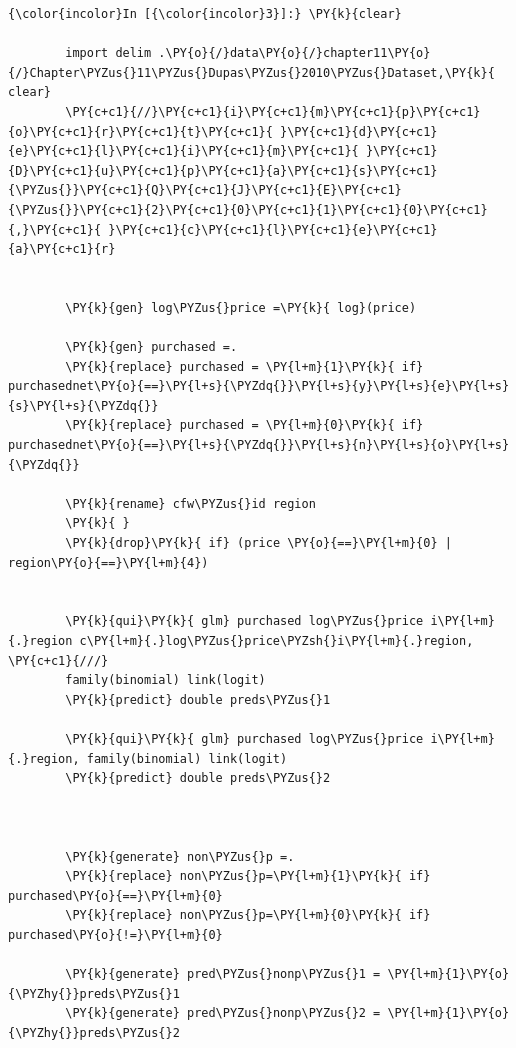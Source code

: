 \documentclass[11pt,notitlepage]{article}\usepackage[]{graphicx}\usepackage[]{color}
\makeatletter
\newenvironment{kframe}{%
 \def\at@end@of@kframe{}%
 \ifinner\ifhmode%
  \def\at@end@of@kframe{\end{minipage}}%
  \begin{minipage}{\columnwidth}%
 \fi\fi%
 \def\FrameCommand##1{\hskip\@totalleftmargin \hskip-\fboxsep
 \colorbox{shadecolor}{##1}\hskip-\fboxsep
     \hskip-\linewidth \hskip-\@totalleftmargin \hskip\columnwidth}%
 \MakeFramed {\advance\hsize-\width
   \@totalleftmargin\z@ \linewidth\hsize
   \@setminipage}}%
 {\par\unskip\endMakeFramed%
 \at@end@of@kframe}
\newenvironment{knitrout}{}{} %
\makeatother
\begin{document}
\begin{enumerate}[a)]
\begin{knitrout}
\color{fgcolor}\begin{kframe}
    \begin{Verbatim}[commandchars=\\\{\}]
{\color{incolor}In [{\color{incolor}3}]:} \PY{k}{clear} 
        
        import delim .\PY{o}{/}data\PY{o}{/}chapter11\PY{o}{/}Chapter\PYZus{}11\PYZus{}Dupas\PYZus{}2010\PYZus{}Dataset,\PY{k}{ clear}
        \PY{c+c1}{//}\PY{c+c1}{i}\PY{c+c1}{m}\PY{c+c1}{p}\PY{c+c1}{o}\PY{c+c1}{r}\PY{c+c1}{t}\PY{c+c1}{ }\PY{c+c1}{d}\PY{c+c1}{e}\PY{c+c1}{l}\PY{c+c1}{i}\PY{c+c1}{m}\PY{c+c1}{ }\PY{c+c1}{D}\PY{c+c1}{u}\PY{c+c1}{p}\PY{c+c1}{a}\PY{c+c1}{s}\PY{c+c1}{\PYZus{}}\PY{c+c1}{Q}\PY{c+c1}{J}\PY{c+c1}{E}\PY{c+c1}{\PYZus{}}\PY{c+c1}{2}\PY{c+c1}{0}\PY{c+c1}{1}\PY{c+c1}{0}\PY{c+c1}{,}\PY{c+c1}{ }\PY{c+c1}{c}\PY{c+c1}{l}\PY{c+c1}{e}\PY{c+c1}{a}\PY{c+c1}{r}
        
        
        \PY{k}{gen} log\PYZus{}price =\PY{k}{ log}(price)
        
        \PY{k}{gen} purchased =.
        \PY{k}{replace} purchased = \PY{l+m}{1}\PY{k}{ if} purchasednet\PY{o}{==}\PY{l+s}{\PYZdq{}}\PY{l+s}{y}\PY{l+s}{e}\PY{l+s}{s}\PY{l+s}{\PYZdq{}}
        \PY{k}{replace} purchased = \PY{l+m}{0}\PY{k}{ if} purchasednet\PY{o}{==}\PY{l+s}{\PYZdq{}}\PY{l+s}{n}\PY{l+s}{o}\PY{l+s}{\PYZdq{}}
        
        \PY{k}{rename} cfw\PYZus{}id region	
        \PY{k}{	}
        \PY{k}{drop}\PY{k}{ if} (price \PY{o}{==}\PY{l+m}{0} | region\PY{o}{==}\PY{l+m}{4})
        
        
        \PY{k}{qui}\PY{k}{ glm} purchased log\PYZus{}price i\PY{l+m}{.}region c\PY{l+m}{.}log\PYZus{}price\PYZsh{}i\PY{l+m}{.}region, \PY{c+c1}{///}
        family(binomial) link(logit)
        \PY{k}{predict} double preds\PYZus{}1
        
        \PY{k}{qui}\PY{k}{ glm} purchased log\PYZus{}price i\PY{l+m}{.}region, family(binomial) link(logit)
        \PY{k}{predict} double preds\PYZus{}2
        
        
        
        \PY{k}{generate} non\PYZus{}p =.
        \PY{k}{replace} non\PYZus{}p=\PY{l+m}{1}\PY{k}{ if} purchased\PY{o}{==}\PY{l+m}{0}
        \PY{k}{replace} non\PYZus{}p=\PY{l+m}{0}\PY{k}{ if} purchased\PY{o}{!=}\PY{l+m}{0}
        
        \PY{k}{generate} pred\PYZus{}nonp\PYZus{}1 = \PY{l+m}{1}\PY{o}{\PYZhy{}}preds\PYZus{}1
        \PY{k}{generate} pred\PYZus{}nonp\PYZus{}2 = \PY{l+m}{1}\PY{o}{\PYZhy{}}preds\PYZus{}2
\end{Verbatim}


\end{kframe}
\end{knitrout}
\end{enumerate}
\end{document}
